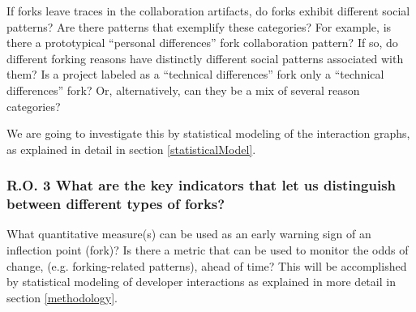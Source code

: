 \documentclass[11pt]{report}
\begin{document}
If forks leave traces in the collaboration artifacts, do forks exhibit different social patterns? Are there patterns that exemplify these categories? For example, is there a prototypical ``personal differences'' fork collaboration pattern? If so, do different forking reasons have distinctly different social patterns associated with them? Is a project labeled as a ``technical differences'' fork only a ``technical differences'' fork? Or, alternatively, can they be a mix of several reason categories?

We are going to investigate this by statistical modeling of the interaction graphs, as explained in detail in section \ref{statisticalModel}.

\subsubsection*{R.O. 3 \hspace{4 mm} What are the key indicators that let us distinguish between different types of forks?\\}

What quantitative measure(s) can be used as an early warning sign of an inflection point (fork)? Is there a metric that can be used to monitor the odds of change, (e.g. forking-related patterns), ahead of time? This will be accomplished by statistical modeling of developer interactions as explained in more detail in section \ref{methodology}.

%
%

\end{document}
